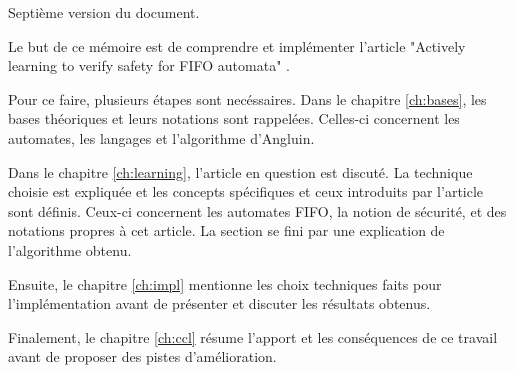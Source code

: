 Septième version du document.


Le but de ce mémoire est de comprendre et implémenter l'article "Actively learning to verify safety for FIFO automata" \cite{Vardhan04}.

Pour ce faire, plusieurs étapes sont necéssaires. Dans le chapitre \ref{ch:bases}, les bases théoriques et leurs notations sont rappelées. Celles-ci concernent les automates, les langages et l'algorithme d'Angluin.

Dans le chapitre \ref{ch:learning}, l'article en question est discuté. La technique choisie est expliquée et les concepts spécifiques et ceux introduits par l'article sont définis. Ceux-ci concernent les automates FIFO, la notion de sécurité, et des notations propres à cet article. La section se fini par une explication de l'algorithme obtenu.

Ensuite, le chapitre \ref{ch:impl} mentionne les choix techniques faits pour l'implémentation avant de présenter et discuter les résultats obtenus.

Finalement, le chapitre \ref{ch:ccl} résume l'apport et les conséquences de ce travail avant de proposer des pistes d'amélioration.
